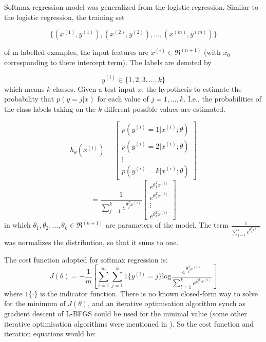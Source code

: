 \documentclass[graybox]{svmult}
\begin{document}
Softmax regression model was generalized  from the logistic regression. Similar to the logistic regression, the training set

\begin{equation}
\{(x^{(1)},y^{(1)}), (x^{(2)},y^{(2)}), \ldots, (x^{(m)},y^{(m)}) \}
\end{equation}

\noindent of m labelled examples, the input features are $x^{(i)} \in \Re^{(n+1)}$ (with $x_0$ corresponding to there intercept term). The labels are denoted by 

\begin{equation}
y^{(i)} \in \{1,2,3,\ldots,k\}
\end{equation}
\noindent which means $k$ classes.
Given a test input $x$, the hypothesis to estimate the probability that $p(y=j|x)$ for each value of $j=1,\ldots,k$. I.e., the probabilities of the class labels taking on the $k$ different possible values are estimated. 

\begin{equation}
h_{\theta}(x^{(i)}) = 
\left[
      \begin{array}{cccccc}
        p(y^{(i)}=1|x^{(i)};\theta) \\
        p(y^{(i)}=2|x^{(i)};\theta) \\
        \vdots \\
        p(y^{(i)}=k|x^{(i)};\theta)
      \end{array}
    \right]
\end{equation}
\begin{equation}
= \frac{1}{\sum_{j=1}^ke^{\theta_j^Tx^{(i)}}}
\left[
      \begin{array}{cccccc}
        e^{\theta_1^Tx^{(i)}}\\
        e^{\theta_2^Tx^{(i)}}\\
        \vdots \\
        e^{\theta_k^Tx^{(i)}}
      \end{array}
    \right]
\end{equation}
\noindent in which $\theta_1,\theta_2,\ldots,\theta_k \in \Re^{(n+1)}$ are parameters of the model. The term $\frac{1}{\sum_{j=1}^ke^{\theta_j^Tx^{(i)}}}$ was normalizes the distribution, so that it sums to one.

The cost function adopted for softmax regression is:
\begin{equation}
J(\theta) = -\frac{1}{m}[\sum_{i=1}^m\sum_{j=1}^k1\{y^{(i)}=j\}\text{log}{\frac{e^{\theta_j^Tx^{(i)}}}{\sum_{l=1}^ke^{\theta_l^Tx^{(i)}}}}]
\end{equation}
where $1\{\cdot\}$ is the indicator function.
There is no known closed-form way to solve for the minimum of $J(\theta)$, and an iterative optimisation algorithm synch as gradient descent of L-BFGS could be used for the minimal value (some other iterative optimisation algorithms were mentioned in \citep{ngiam2011optimization}).
So the cost function and iteration equations would be:
\end{document}
